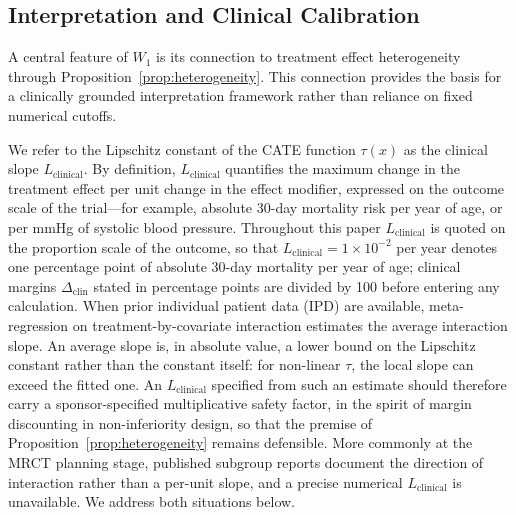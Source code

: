 \documentclass[AMA,Times1COL]{WileyNJDv5}
\begin{document}
\subsection{Interpretation and Clinical Calibration}\label{sec:inference}

A central feature of $W_1$ is its connection to treatment effect heterogeneity through Proposition~\ref{prop:heterogeneity}. This connection provides the basis for a clinically grounded interpretation framework rather than reliance on fixed numerical cutoffs.

We refer to the Lipschitz constant of the CATE function $\tau(x)$ as the clinical slope $L_{\text{clinical}}$. By definition, $L_{\text{clinical}}$ quantifies the maximum change in the treatment effect per unit change in the effect modifier, expressed on the outcome scale of the trial---for example, absolute 30-day mortality risk per year of age, or per mmHg of systolic blood pressure. Throughout this paper $L_{\text{clinical}}$ is quoted on the proportion scale of the outcome, so that $L_{\text{clinical}} = 1 \times 10^{-2}$ per year denotes one percentage point of absolute 30-day mortality per year of age; clinical margins $\Delta_{\text{clin}}$ stated in percentage points are divided by 100 before entering any calculation. When prior individual patient data (IPD) are available, meta-regression on treatment-by-covariate interaction estimates the average interaction slope.\cite{riley2010,fisher2017} An average slope is, in absolute value, a lower bound on the Lipschitz constant rather than the constant itself: for non-linear $\tau$, the local slope can exceed the fitted one. An $L_{\text{clinical}}$ specified from such an estimate should therefore carry a sponsor-specified multiplicative safety factor, in the spirit of margin discounting in non-inferiority design, so that the premise of Proposition~\ref{prop:heterogeneity} remains defensible. More commonly at the MRCT planning stage, published subgroup reports document the direction of interaction rather than a per-unit slope, and a precise numerical $L_{\text{clinical}}$ is unavailable. We address both situations below.
\end{document}
